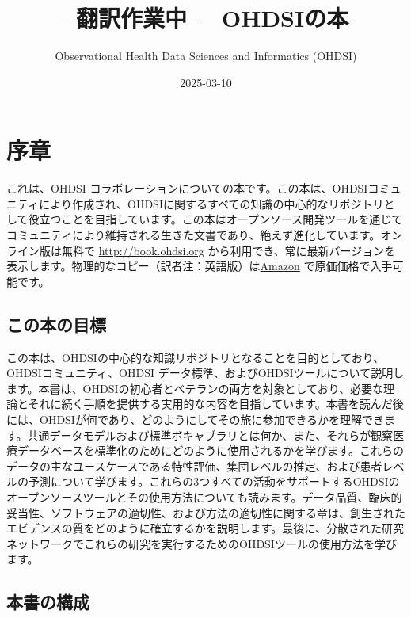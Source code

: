 \documentclass[
  11pt]{book}
\title{--翻訳作業中--　OHDSIの本}
\author{Observational Health Data Sciences and Informatics (OHDSI)}
\date{2025-03-10}
\theoremstyle{definition}
\theoremstyle{definition}
\theoremstyle{definition}
\theoremstyle{definition}
\theoremstyle{remark}
\begin{document}
\maketitle

{
\setcounter{tocdepth}{1}
\tableofcontents
}
\chapter*{序章}\label{ux5e8fux7ae0}

これは、OHDSI コラボレーションについての本です。この本は、OHDSIコミュニティにより作成され、OHDSIに関するすべての知識の中心的なリポジトリとして役立つことを目指しています。この本はオープンソース開発ツールを通じてコミュニティにより維持される生きた文書であり、絶えず進化しています。オンライン版は無料で \url{http://book.ohdsi.org} から利用でき、常に最新バージョンを表示します。物理的なコピー（訳者注：英語版）は\href{https://www.amazon.com/OHDSI-Observational-Health-Sciences-Informatics/dp/1088855199}{Amazon} で原価価格で入手可能です。

\section*{この本の目標}\label{ux3053ux306eux672cux306eux76eeux6a19}

この本は、OHDSIの中心的な知識リポジトリとなることを目的としており、OHDSIコミュニティ、OHDSI データ標準、およびOHDSIツールについて説明します。本書は、OHDSIの初心者とベテランの両方を対象としており、必要な理論とそれに続く手順を提供する実用的な内容を目指しています。本書を読んだ後には、OHDSIが何であり、どのようにしてその旅に参加できるかを理解できます。共通データモデルおよび標準ボキャブラリとは何か、また、それらが観察医療データベースを標準化のためにどのように使用されるかを学びます。これらのデータの主なユースケースである特性評価、集団レベルの推定、および患者レベルの予測について学びます。これらの3つすべての活動をサポートするOHDSIのオープンソースツールとその使用方法についても読みます。データ品質、臨床的妥当性、ソフトウェアの適切性、および方法の適切性に関する章は、創生されたエビデンスの質をどのように確立するかを説明します。最後に、分散された研究ネットワークでこれらの研究を実行するためのOHDSIツールの使用方法を学びます。

\section*{本書の構成}\label{ux672cux66f8ux306eux69cbux6210}
\end{document}
